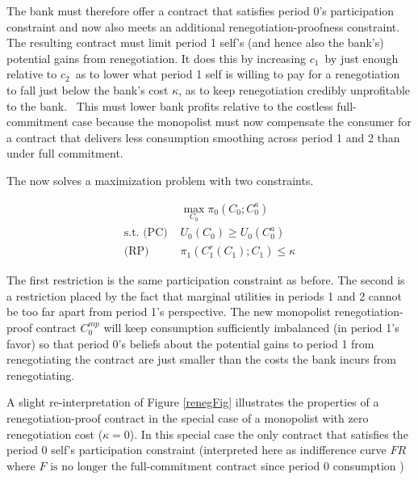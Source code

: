 \documentclass[11pt]{article}%
\begin{document}
The bank must therefore offer a contract that satisfies
period 0's participation constraint and now also meets an additional renegotiation-proofness constraint. The resulting
contract must limit period 1 self's (and hence also the bank's) potential
gains from renegotiation. It does this by increasing $c_{1}$\ by just enough
relative to $c_{2}$\ as to lower what period 1 self is willing to pay for a
renegotiation to fall  just below the bank's cost $\kappa$, as to keep
renegotiation credibly unprofitable to the bank. \ This must lower bank profits relative to the costless full-commitment case because
the monopolist  must now compensate the consumer for a contract that delivers less
consumption smoothing across period 1 and 2 than under full commitment.

    

The now solves a maximization
problem with two constraints. 


\begin{align*}
&  \max_{C_{0}}\pi_{0}\left(  C_{0};C_{0}^{a}\right) \\
\text{s.t. (PC) }  &  U_{0}\left(  C_{0}\right)  \geq U_{0}\left(  C_{0}%
^{a}\right) \\
\text{(RP) }  &  \pi_{1}\left(  C_{1}^{r}\left(  C_{1}\right)  ;C_{1}\right)
\leq\kappa
\end{align*}


The first restriction is the same participation constraint as before. The
second is a restriction placed by the fact that marginal utilities in periods
1 and 2 cannot be too far apart from period 1's perspective. The new monopolist renegotiation-proof contract $C_{0}^{mp}$ will keep consumption sufficiently
imbalanced (in period 1's favor) so that period 0's beliefs about the
potential gains to period 1 from renegotiating the contract are just smaller
than the costs the bank incurs from renegotiating. 

A slight re-interpretation of Figure  \ref{renegFig}
illustrates the properties of a renegotiation-proof contract in the special case of a monopolist with zero renegotiation cost ($\kappa=0$). In this special case the only contract that satisfies the period 0 self's participation constraint (interpreted here as indifference curve $FR$ where \(F\text{ is no longer the full-commitment contract }\)since period 0 consumption )
\end{document}
